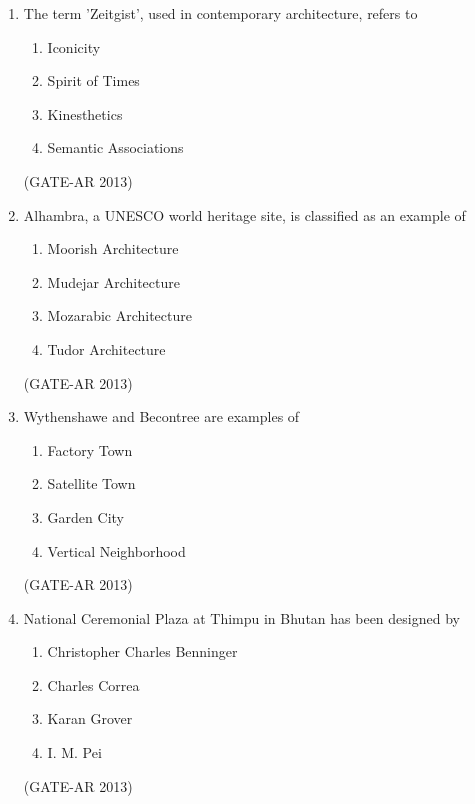\documentclass[a4paper,10pt]{article}
\begin{document}
\begin{enumerate}
    \item The term 'Zeitgist', used in contemporary architecture, refers to 
    \begin{multicols}{4}
	\begin{enumerate}
        \item Iconicity
        \item Spirit of Times
        \item Kinesthetics
        \item Semantic Associations
    \end{enumerate}
	\end{multicols}
    \hfill (GATE-AR 2013)

    \item Alhambra, a UNESCO world heritage site, is classified as an example of 
    \begin{multicols}{2}
	\begin{enumerate}
        \item Moorish Architecture
        \item Mudejar Architecture
        \item Mozarabic Architecture
        \item Tudor Architecture
    \end{enumerate}
	\end{multicols}
    \hfill (GATE-AR 2013)

    \item Wythenshawe and Becontree are examples of 
    \begin{multicols}{2}
	\begin{enumerate}
        \item Factory Town
        \item Satellite Town
        \item Garden City
        \item Vertical Neighborhood
    \end{enumerate}
	\end{multicols}
    \hfill (GATE-AR 2013)

    \item National Ceremonial Plaza at Thimpu in Bhutan has been designed by 
    \begin{multicols}{2}
	\begin{enumerate}
        \item Christopher Charles Benninger
        \item Charles Correa
        \item Karan Grover
        \item I. M. Pei
    \end{enumerate}
	\end{multicols}
    \hfill (GATE-AR 2013)
    

\end{enumerate}
\end{document}

